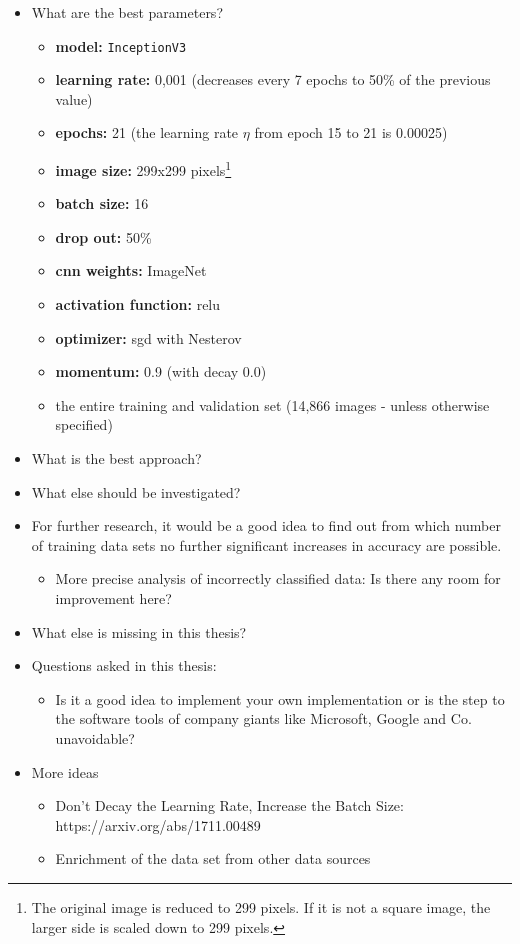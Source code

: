 \documentclass[10pt]{article}
\begin{document}
		\begin{itemize}
			\setlength\itemsep{0em}
			\item What are the best parameters?
					\begin{itemize}
						\setlength\itemsep{0em}
						\item \textbf{model:} \texttt{InceptionV3}
						\item \textbf{learning rate:} 0,001 (decreases every 7 epochs to 50\% of the previous value)
						\item \textbf{epochs:} 21 (the learning rate \(\eta\) from epoch 15 to 21 is 0.00025)
						\item \textbf{image size:} 299x299 pixels\footnote{The original image is reduced to 299 pixels. If it is not a square image, the larger side is scaled down to 299 pixels.}
						\item \textbf{batch size:} 16
						\item \textbf{drop out:} 50\%
						\item \textbf{\ac{cnn} weights:} ImageNet
						\item \textbf{activation function:} \ac{relu}
						\item \textbf{optimizer:} \ac{sgd} with Nesterov
						\item \textbf{momentum:} 0.9 (with decay 0.0)
						\item the entire training and validation set (14,866 images - unless otherwise specified)
					\end{itemize}
			\item What is the best approach?
			\item What else should be investigated?
			\item For further research, it would be a good idea to find out from which number of training data sets no further significant increases in accuracy are possible.
			\begin{itemize}
				\setlength\itemsep{0em}
				\item More precise analysis of incorrectly classified data: Is there any room for improvement here?
			\end{itemize}
			\item What else is missing in this thesis?
			\item Questions asked in this thesis:
			\begin{itemize}
				\setlength\itemsep{0em}
				\item Is it a good idea to implement your own implementation or is the step to the software tools of company giants like Microsoft, Google and Co. unavoidable?
			\end{itemize}
			\item More ideas
			\begin{itemize}
				\setlength\itemsep{0em}
				\item Don't Decay the Learning Rate, Increase the Batch Size: https://arxiv.org/abs/1711.00489
				\item Enrichment of the data set from other data sources
			\end{itemize}
		\end{itemize}
		
\end{document}
